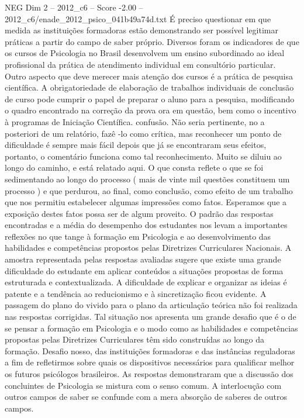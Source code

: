 \begin{textsample}{NEG Dim 2 – 2012\_c6 – Score -2.00 – 2012\_c6/enade\_2012\_psico\_041b49a74d.txt}
É preciso questionar em que medida as instituições formadoras estão demonstrando ser possível legitimar práticas a partir do campo de saber próprio.
Diversos foram os indicadores de que os cursos de Psicologia no Brasil desenvolvem um ensino subordinado ao ideal profissional da prática de atendimento individual em consultório particular.
Outro aspecto que deve merecer mais atenção dos cursos é a prática de pesquisa científica.
A obrigatoriedade de elaboração de trabalhos individuais de conclusão de curso pode cumprir o papel de preparar o aluno para a pesquisa, modificando o quadro encontrado na correção da prova ora em questão, bem como o incentivo à programas de Iniciação Científica. confusão.
Não seria pertinente, no a posteriori de um relatório, fazê -lo como crítica, mas reconhecer um ponto de dificuldade é sempre mais fácil depois que já se encontraram seus efeitos, portanto, o comentário funciona como tal reconhecimento.
Muito se diluiu ao longo do caminho, e está relatado aqui.
O que consta reflete o que se foi sedimentando ao longo do processo ( mais de vinte mil questões constituem um processo ) e que perdurou, ao final, como conclusão, como efeito de um trabalho que nos permitiu estabelecer algumas impressões como fatos.
Esperamos que a exposição destes fatos possa ser de algum proveito.
O padrão das respostas encontradas e a média do desempenho dos estudantes nos levam a importantes reflexões no que tange à formação em Psicologia e ao desenvolvimento das habilidades e competências propostos pelas Diretrizes Curriculares Nacionais.
A amostra representada pelas respostas avaliadas sugere que existe uma grande dificuldade do estudante em aplicar conteúdos a situações propostas de forma estruturada e contextualizada.
A dificuldade de explicar e organizar as ideias é patente e a tendência ao reducionismo e à sincretização ficou evidente.
A passagem do plano do vivido para o plano da articulação teórica não foi realizada nas respostas corrigidas.
Tal situação nos apresenta um grande desafio que é o de se pensar a formação em Psicologia e o modo como as habilidades e competências propostas pelas Diretrizes Curriculares têm sido construídas ao longo da formação.
Desafio nosso, das instituições formadoras e das instâncias reguladoras a fim de refletirmos sobre quais os dispositivos necessários para qualificar melhor os futuros psicólogos brasileiros.
As respostas demonstraram que a discussão dos concluintes de Psicologia se mistura com o senso comum.
A interlocução com outros campos de saber se confunde com a mera absorção de saberes de outros campos.

\end{textsample}

